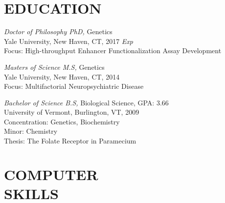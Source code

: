 \documentclass[margin, 10pt]{res} %
\begin{document}
\begin{resume}

 



\section{EDUCATION}

{\sl Doctor of Philosophy PhD,} Genetics \\
Yale University, New Haven, CT, 2017 \textit{Exp}\\
Focus: High-throughput Enhancer Functionalization Assay Development 

{\sl Masters of Science M.S,} Genetics \\
Yale University, New Haven, CT, 2014 \\
Focus: Multifactorial Neuropsychiatric Disease  

{\sl Bachelor of Science B.S,} Biological Science, GPA: 3.66 \\
University of Vermont, Burlington, VT, 2009 \\
Concentration: Genetics, Biochemistry \\
Minor: Chemistry \\
Thesis: The Folate Receptor in Paramecium


\section{COMPUTER \\ SKILLS} 


\end{resume}
\end{document}
